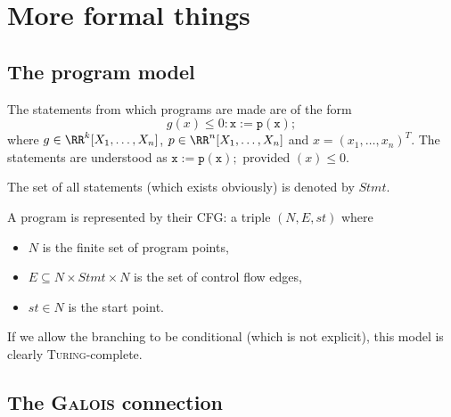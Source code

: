 \documentclass[a4paper, twoside, 10pt]{article}
\begin{document}
\section{More formal things}

\subsection{The program model}

\begin{definition}[Statement]
    The statements from which programs are made are of the form
    \[
        g(x) \leqslant 0: \mathtt{x := p(x);}
    \]
    where $g\in\RR^k[X_1,\ldots,X_n]$, $p\in\RR^n[X_1,\ldots,X_n]$ and $x=(x_1,\ldots,x_n)^T$. The statements are understood as $\mathtt{x := p(x);}$ provided $(x) \leqslant 0$.
\end{definition}

\begin{notation}
    The set of all statements (which exists obviously) is denoted by $Stmt$.
\end{notation}

\bigskip

\begin{definition}[Program]
    A program is represented by their CFG: a triple $(N, E, st)$ where
    \begin{itemize}
        \item $N$ is the finite set of program points,
        \item $E \subseteq N\times Stmt \times N$ is the set of control flow edges,
        \item $st \in N$ is the start point.
    \end{itemize}
\end{definition}

If we allow the branching to be conditional (which is not explicit), this model is clearly \textsc{Turing}-complete.


\subsection{The \textsc{Galois} connection}
\end{document}

